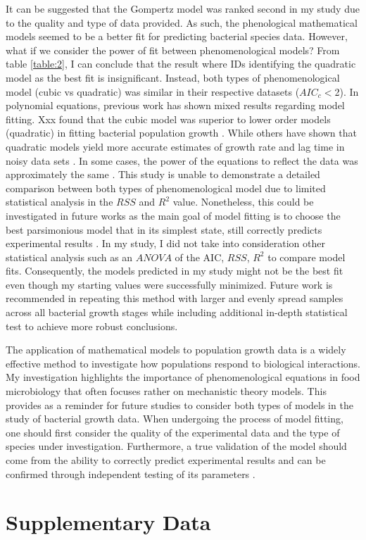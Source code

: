\documentclass[11pt]{article}
\begin{document}
It can be suggested that the Gompertz model was ranked second in my study due to the quality and type of data provided. As such, the phenological
mathematical models seemed to be a better fit for predicting bacterial species data. However, what if we consider the power of fit between
phenomenological models? From table \ref{table:2}, I can conclude that the result where IDs identifying the quadratic model as the best fit is insignificant.
Instead, both types of phenomenological model (cubic vs quadratic) was similar in their respective datasets ($AIC_{c}<$2). In polynomial equations, previous work has shown mixed 
results regarding model fitting. Xxx found that the cubic model was superior to lower order models (quadratic) in fitting bacterial population 
growth \cite{murphy_development_1996}. While others have shown that quadratic models yield more accurate estimates of growth rate and lag time in noisy data sets \cite{ng_mathematical_1997,gauch_prediction_1993,mcclure_predictive_1997}.
In some cases, the power of the equations to reflect the data was approximately the same \cite{gibson_predicting_1988}. This study is unable to demonstrate a 
detailed comparison between both types of phenomenological model due to limited statistical analysis in the $RSS$ and $R^{2}$ value. 
Nonetheless, this could be investigated in future works as the main goal of model fitting is to choose the best parsimonious model that in its 
simplest state, still correctly predicts experimental results \cite{gauch_prediction_1993,gibson_predicting_1988}. In my study, I did not take into consideration other statistical analysis
such as an $ANOVA$ of the AIC, $RSS$, $R^{2}$ to compare model fits. Consequently, the models predicted in my study might not be the best fit even 
though my starting values were successfully minimized. Future work is recommended in repeating this method with larger and evenly spread 
samples across all bacterial growth stages while including additional in-depth statistical test to achieve more robust conclusions.

The application of mathematical models to population growth data is a widely effective method to investigate how populations respond to 
biological interactions. My investigation highlights the importance of phenomenological equations in food microbiology that often focuses rather
on mechanistic theory models. This provides as a reminder for future studies to consider both types of models in the study of bacterial growth data.
When undergoing the process of model fitting, one should first consider the quality of the experimental data and the type of species under
investigation. Furthermore, a true validation of the model should come from the ability to correctly predict experimental results and can be 
confirmed through independent testing of its parameters \cite{peleg_microbial_2011}.



\nolinenumbers


\section{Supplementary Data}
\end{document}
